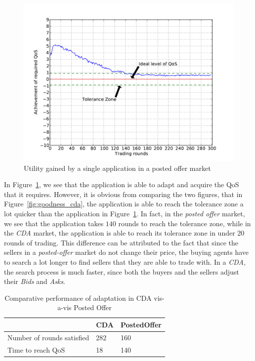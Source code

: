 \documentclass[10pt,journal,compsoc]{IEEEtran}
\begin{document}
\begin{figure}[h]
	\centering
	\includegraphics[scale=0.45]{graphs/posted_offer_singleapp_bimodal_qa.pdf}
	\caption{Utility gained by a single application in a posted offer market \label{fig:goodness_posted_offer}}
\end{figure}

In Figure~\ref{fig:goodness_posted_offer}, we see that the application is able to adapt and acquire the QoS that it requires. However, it is obvious from comparing the two figures, that in Figure~\ref{fig:goodness_cda}, the application is able to reach the tolerance zone a lot quicker than the application in Figure~\ref{fig:goodness_posted_offer}. In fact, in the \textit{posted offer} market, we see that the application takes $140$ rounds to reach the tolerance zone, while in the \textit{CDA} market, the application is able to reach its tolerance zone in under 20 rounds of trading. This difference can be attributed to the fact that since the sellers in a \textit{posted-offer} market do not change their price, the buying agents have to search a lot longer to find sellers that they are able to trade with. In a \textit{CDA}, the search process is much faster, since both the buyers and the sellers adjust their \textit{Bids} and \textit{Asks}.

\begin{table}[H]\footnotesize
\centering
\begin{tabular}{p{5cm}p{2cm}p{2cm}}
 \toprule
	& \textbf{CDA} & \textbf{PostedOffer} \\
 \midrule
	Number of rounds satisfied & 282 & 160 \\ 
	Time to reach QoS & 18 & 140 \\ 
\bottomrule
\end{tabular}
\caption{Comparative performance of adaptation in CDA vis-a-vis Posted Offer \label{tbl:comparative_performance}}
\end{table}
	
\end{document}
